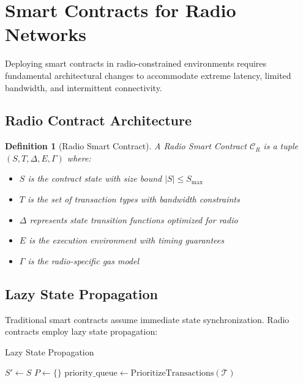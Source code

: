 \documentclass[11pt,a4paper]{article}
\newtheorem{definition}[theorem]{Definition}
\begin{document}
\section{Smart Contracts for Radio Networks}

Deploying smart contracts in radio-constrained environments requires fundamental architectural changes to accommodate extreme latency, limited bandwidth, and intermittent connectivity.

\subsection{Radio Contract Architecture}

\begin{definition}[Radio Smart Contract]
A Radio Smart Contract $\mathcal{C}_R$ is a tuple $(S, T, \Delta, E, \Gamma)$ where:
\begin{itemize}
\item $S$ is the contract state with size bound $|S| \leq S_{\max}$
\item $T$ is the set of transaction types with bandwidth constraints
\item $\Delta$ represents state transition functions optimized for radio
\item $E$ is the execution environment with timing guarantees
\item $\Gamma$ is the radio-specific gas model
\end{itemize}
\end{definition}

\subsection{Lazy State Propagation}

Traditional smart contracts assume immediate state synchronization. Radio contracts employ lazy state propagation:

\begin{algorithm}[H]
\SetAlgoLined
{}
\caption{Lazy State Propagation}

$S' \leftarrow S$\;
$P \leftarrow \{\}$\;
$\text{priority\_queue} \leftarrow \text{PrioritizeTransactions}(\mathcal{T})$\;

\;
\end{algorithm}
\end{document}
